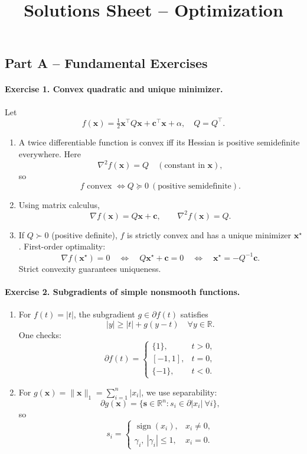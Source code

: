 \documentclass[11pt]{article}
\title{Solutions Sheet -- Optimization}
\author{}
\date{}
\begin{document}
\maketitle

\subsection*{Part A -- Fundamental Exercises}

\paragraph{Exercise 1. Convex quadratic and unique minimizer.}

Let
\[
f(\bm{x}) = \tfrac{1}{2}\bm{x}^\top Q \bm{x} + \bm{c}^\top \bm{x} + \alpha,
\quad Q=Q^\top.
\]

\begin{enumerate}
\item A twice differentiable function is convex iff its Hessian is positive semidefinite everywhere.  
Here
\[
\nabla^2 f(\bm{x}) = Q \quad (\text{constant in } \bm{x}),
\]
so
\[
f \text{ convex } \Longleftrightarrow Q \succeq 0 \ (\text{positive semidefinite}).
\]

\item Using matrix calculus,
\[
\nabla f(\bm{x}) = Q\bm{x} + \bm{c},\qquad
\nabla^2 f(\bm{x}) = Q.
\]

\item If $Q\succ 0$ (positive definite), $f$ is strictly convex and has a unique minimizer $\bm{x}^\star$.  
First-order optimality:
\[
\nabla f(\bm{x}^\star) = 0
\quad\Longleftrightarrow\quad
Q\bm{x}^\star + \bm{c} = 0
\quad\Longleftrightarrow\quad
\bm{x}^\star = -Q^{-1}\bm{c}.
\]
Strict convexity guarantees uniqueness.
\end{enumerate}

\bigskip

\paragraph{Exercise 2. Subgradients of simple nonsmooth functions.}

\begin{enumerate}
\item For $f(t)=|t|$, the subgradient $g\in\partial f(t)$ satisfies
\[
|y| \ge |t| + g(y-t) \quad \forall y\in\mathbb{R}.
\]
One checks:
\[
\partial f(t)=
\begin{cases}
\{1\}, & t>0,\\[4pt]
[-1,1], & t=0,\\[4pt]
\{-1\}, & t<0.
\end{cases}
\]

\item For $g(\bm{x})=\|\bm{x}\|_1=\sum_{i=1}^n |x_i|$, we use separability:
\[
\partial g(\bm{x}) = \{\bm{s}\in\mathbb{R}^n : s_i\in\partial |x_i|\ \forall i\},
\]
so
\[
s_i =
\begin{cases}
\operatorname{sign}(x_i), & x_i\neq 0,\\[4pt]
\gamma_i,\ |\gamma_i|\le 1, & x_i = 0.
\end{cases}
\]
\end{enumerate}
\end{document}
